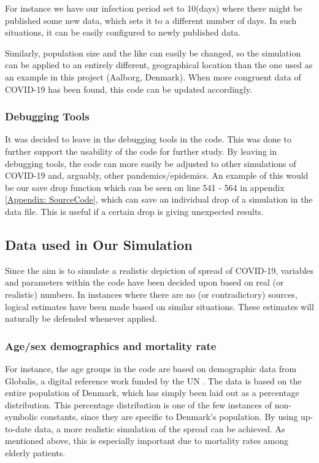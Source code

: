For instance we have our infection period set to 10(days) where there might be published some new data, which sets it to a different number of days. In such situations, it can be easily configured to newly published data. 

Similarly, population size and the like can easily be changed, so the simulation can be applied to an entirely different, geographical location than the one used as an example in this project (Aalborg, Denmark). When more congruent data of COVID-19 has been found, this code can be updated accordingly. 

\subsubsection{Debugging Tools}

It was decided to leave in the debugging tools in the code. This was done to further support the usability of the code for further study. By leaving in debugging tools, the code can more easily be adjusted to other simulations of COVID-19 and, arguably, other pandemics/epidemics. An example of this would be our save drop function which can be seen on line 541 - 564 in appendix \ref{Appendix: SourceCode}, which can save an individual drop of a simulation in the data file. This is useful if a certain drop is giving unexpected results.

\subsection{Data used in Our Simulation} \label{subsec:Data in Sim}

Since the aim is to simulate a realistic depiction of spread of COVID-19, variables and parameters within the code have been decided upon based on real (or realistic) numbers. In instances where there are no (or contradictory) sources, logical estimates have been made based on similar situations. These estimates will naturally be defended whenever applied.

\subsubsection{Age/sex demographics and mortality rate}
For instance, the age groups in the code are based on demographic data from Globalis, a digital reference work funded by the UN \citep{globalisdk_danmark_2020}. The data is based on the entire population of Denmark, which has simply been laid out as a percentage distribution. This percentage distribution is one of the few instances of non-symbolic constants, since they are specific to Denmark's population. By using up-to-date data, a more realistic simulation of the spread can be achieved. As mentioned above, this is especially important due to mortality rates among elderly patients.

